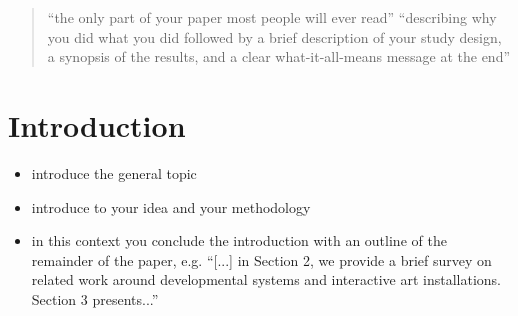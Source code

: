 \documentclass{sig-alternate-05-2015}
\begin{document}
%
\author{
%
%
\alignauthor
Sebastian von Mammen and Sarah Edenhofer\\
       \\
       \\
       }

\maketitle
\begin{abstract}
``the only part of your paper most people will ever read''
``describing why you did what you did followed by a brief description of your study design, a synopsis of the results, and a clear what-it-all-means message at the end''
\end{abstract}

\section{Introduction}
\begin{itemize}
\item introduce the general topic
\item introduce to your idea and your methodology
\item in this context you conclude the introduction with an outline of the remainder of the paper, e.g. ``[...] in Section 2, we provide a brief survey on related work around developmental systems and interactive art installations. Section 3 presents...''
\end{itemize}
\end{document}

